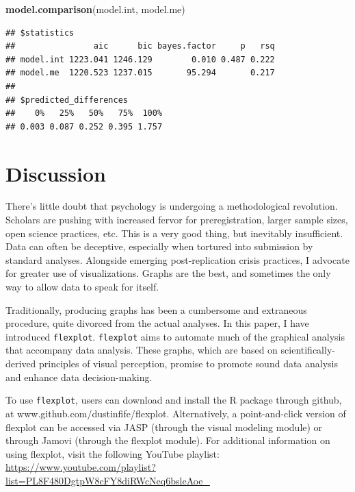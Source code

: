 \documentclass[
  man]{apa6}
\newenvironment{Shaded}{\begin{snugshade}}{\end{snugshade}}
\newcommand{\KeywordTok}[1]{\textcolor[rgb]{0.13,0.29,0.53}{\textbf{#1}}}
\newcommand{\NormalTok}[1]{#1}
\begin{document}
\small

\begin{Shaded}
\begin{Highlighting}[]
\KeywordTok{model.comparison}\NormalTok{(model.int, model.me)}
\end{Highlighting}
\end{Shaded}

\begin{verbatim}
## $statistics
##                aic      bic bayes.factor     p   rsq
## model.int 1223.041 1246.129        0.010 0.487 0.222
## model.me  1220.523 1237.015       95.294       0.217
## 
## $predicted_differences
##    0%   25%   50%   75%  100% 
## 0.003 0.087 0.252 0.395 1.757
\end{verbatim}

\normalsize

\hypertarget{discussion}{%
\section{Discussion}\label{discussion}}

There's little doubt that psychology is undergoing a methodological revolution. Scholars are pushing with increased fervor for preregistration, larger sample sizes, open science practices, etc. This is a very good thing, but inevitably insufficient. Data can often be deceptive, especially when tortured into submission by standard analyses. Alongside emerging post-replication crisis practices, I advocate for greater use of visualizations. Graphs are the best, and sometimes the only way to allow data to speak for itself.

Traditionally, producing graphs has been a cumbersome and extraneous procedure, quite divorced from the actual analyses. In this paper, I have introduced \texttt{flexplot}. \texttt{flexplot} aims to automate much of the graphical analysis that accompany data analysis. These graphs, which are based on scientifically-derived principles of visual perception, promise to promote sound data analysis and enhance data decision-making.

To use \texttt{flexplot}, users can download and install the R package through github, at www.github.com/dustinfife/flexplot. Alternatively, a point-and-click version of flexplot can be accessed via JASP (through the visual modeling module) or through Jamovi (through the flexplot module). For additional information on using flexplot, visit the following YouTube playlist: \url{https://www.youtube.com/playlist?list=PL8F480DgtpW8cFY8diRWcNeq6bsleAoe_}
\end{document}
